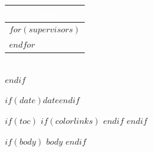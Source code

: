 \documentclass[$if(fontsize)$$fontsize$,$endif$$if(lang)$$babel-lang$,$endif$$if(papersize)$$papersize$paper,$endif$$for(classoption)$$classoption$$sep$,$endfor$]{$documentclass$}
\renewcommand{\arraystretch}{1.4}
\newcommand{\rounded}[1]{\textbf{\textcolor{white}{#1}}}
\begin{document}
\begin{titlepage}
\begin{center}
\begin{minipage}{\textwidth}
\begin{center}
\setlength{\arrayrulewidth}{0.8pt}
\setlength{\doublerulesep}{2pt}
\renewcommand{\arraystretch}{1.8}

\begin{tabular}{@{}p{9cm}@{}}
\multicolumn{1}{c}{\cellcolor{accent}\rounded{Name}} \\
\hline
$for(supervisors)$
\multicolumn{1}{c}{$supervisors$} \\
\hline
$endfor$
\end{tabular}
\end{center}
\end{minipage}\\[0.8cm]
$endif$

$if(date)${\large $date$}$endif$

\end{center}
\end{titlepage}

$if(toc)$
{
$if(colorlinks)$
\hypersetup{linkcolor=$if(toccolor)$$toccolor$$else$accent$endif$}
$endif$
\setcounter{tocdepth}{$toc-depth$}
\tableofcontents
}
$endif$

$if(body)$
$body$
$endif$
\end{document}
